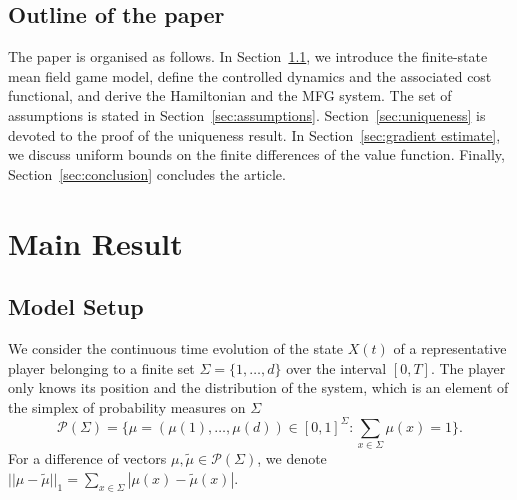 \documentclass[11pt,a4paper]{amsart}
\theoremstyle{definition}
\newcommand{\calP}{\mathcal{P}}
\begin{document}
\subsection*{Outline of the paper}

The paper is organised as follows. 
In Section~\ref{sec:model}, we introduce the finite-state mean field game model, define the controlled dynamics and the associated cost functional, and derive the Hamiltonian and the MFG system. 
The set of assumptions is stated in Section~\ref{sec:assumptions}.
Section~\ref{sec:uniqueness} is devoted to the proof of the uniqueness result. 
In Section~\ref{sec:gradient estimate}, we discuss
uniform bounds on the finite differences of the value function.
Finally, Section~\ref{sec:conclusion} concludes the article.



\section{Main Result}

\subsection{Model Setup}\label{sec:model}

We consider the continuous time evolution of the state $X(t)$ of a representative player belonging to a finite set $\Sigma = \{1,\ldots,d\}$ over the interval $[0,T]$.
The player only knows its position and the distribution of the system, which is an element of the simplex of probability measures on $\Sigma$
\begin{equation*}
    \calP(\Sigma) = \Big\{ \mu = (\mu(1),\ldots,\mu(d)) \in [0,1]^{\Sigma} \colon \sum_{x\in\Sigma}\mu(x) = 1 \Big\}.
\end{equation*}
For a difference of vectors $\mu, \tilde\mu\in\calP(\Sigma)$, we denote $||\mu-\tilde\mu||_1= \sum_{x\in \Sigma} |\mu(x) - \tilde\mu (x)|$.
\end{document}
